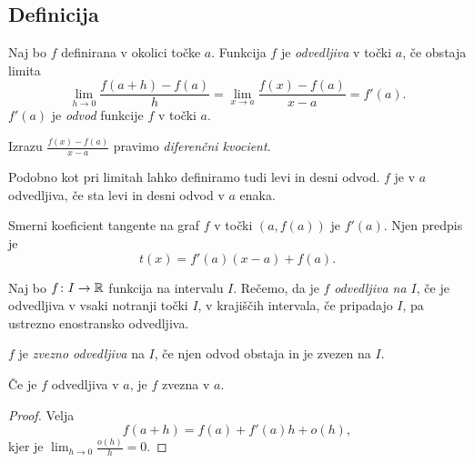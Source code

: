 \documentclass[12pt, a4paper]{article}
\begin{document}
\subsection{Definicija}

\begin{okvir}
\begin{definicija}
Naj bo $f$ definirana v okolici točke $a$. Funkcija $f$ je \emph{odvedljiva} v točki $a$, če obstaja limita
\[
\lim_{h\to 0}\frac{f(a+h)-f(a)}{h}=\lim_{x\to a}\frac{f(x)-f(a)}{x-a}=f'(a).
\]
$f'(a)$ je \emph{odvod} funkcije $f$ v točki $a$.
\end{definicija}
\end{okvir}

\begin{opomba}
Izrazu $\frac{f(x)-f(a)}{x-a}$ pravimo \emph{diferenčni kvocient}.
\end{opomba}

\begin{opomba}
Podobno kot pri limitah lahko definiramo tudi levi in desni odvod. $f$ je v $a$ odvedljiva, če sta levi in desni odvod v $a$ enaka.
\end{opomba}

\begin{trditev}
Smerni koeficient tangente na graf $f$ v točki $(a,f(a))$ je $f'(a)$. Njen predpis je
\[
t(x)=f'(a)(x-a)+f(a).
\]
\end{trditev}

\begin{definicija}
Naj bo $f\colon I\to\mathbb{R}$ funkcija na intervalu $I$. Rečemo, da je $f$ \emph{odvedljiva na $I$}, če je odvedljiva v vsaki notranji točki $I$, v krajiščih intervala, če pripadajo $I$, pa ustrezno enostransko odvedljiva.
\end{definicija}

\begin{definicija}
$f$ je \emph{zvezno odvedljiva} na $I$, če njen odvod obstaja in je zvezen na $I$.
\end{definicija}

\begin{trditev}
Če je $f$ odvedljiva v $a$, je $f$ zvezna v $a$.
\end{trditev}

\begin{proof}
Velja
\[
f(a+h)=f(a)+f'(a)h+o(h),
\]
kjer je $\displaystyle\lim_{h\to 0}\frac{o(h)}{h}=0$.
\end{proof}
\end{document}
